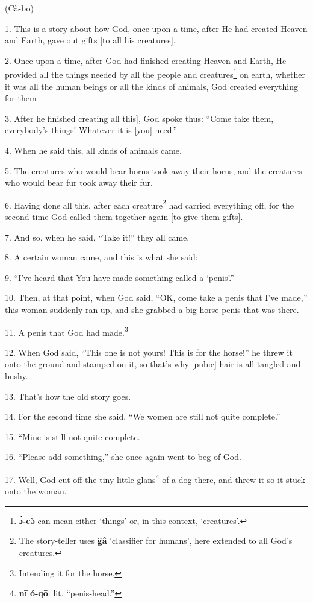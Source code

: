 \setcounter{footnote}{0}

(Cà-bo)

1. This is a story about how God, once upon a time, after He had created Heaven
and Earth, gave out gifts [to all his creatures].

2. Once upon a time, after God had finished creating Heaven and Earth, He provided
all the things needed by all the people and creatures\footnote{\textbf{ɔ̀-cə̀} can mean either `things' or, in this context, `creatures'.} on earth, whether it was
all the human beings or all the kinds of animals, God created everything for them

3. After he finished creating all this], God spoke thus: ``Come take them, everybody's
things! Whatever it is [you] need.''

4. When he said this, all kinds of animals came.

5. The creatures who would bear horns took away their horns, and the creatures
who would bear fur took away their fur.

6. Having done all this, after each creature\footnote{The story-teller uses \textbf{g̈â} `classifier for humans', here extended to all God's creatures.} had carried everything off, for
the second time God called them together again [to give them gifts].

7. And so, when he said, ``Take it!'' they all came.

8. A certain woman came, and this is what she said:

9. ``I've heard that You have made something called a `penis'.''

10. Then, at that point, when God said, ``OK, come take a penis that I've made,''
this woman suddenly ran up, and she grabbed a big horse penis that was there.

11. A penis that God had made.\footnote{Intending it for the horse.}

12. When God said, ``This one is not yours! This is for the horse!'' he threw it
onto the ground and stamped on it, so that's why [pubic] hair is all tangled and
bushy.

13. That's how the old story goes.

14. For the second time she said, ``We women are still not quite complete.''

15. ``Mine is still not quite complete.

16. ``Please add something,'' she once again went to beg of God.

17. Well, God cut off the tiny little glans\footnote{\textbf{nī} \textbf{ó-qō}: lit. ``penis-head.''} of a dog there, and threw it so
it stuck onto the woman.

